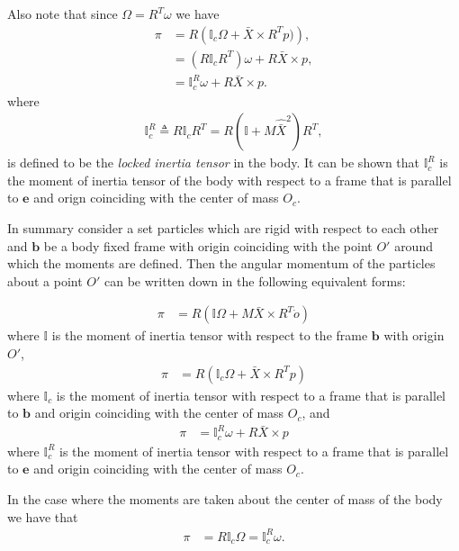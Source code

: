 \documentclass[graybox,envcountchap,sectrefs]{svmonoMuga}
\begin{document}
Also note that since $\Omega =R^T\omega$ we have
\begin{align}
\pi&=R\left(\mathbb{I}_c\Omega +\bar{X}\times R^Tp)\right),\\
&=(R\mathbb{I}_cR^T)\omega +R\bar{X}\times p,\\
&=\mathbb{I}_c^R\omega +R\bar{X}\times p.
\end{align}
where 
\begin{align}
\mathbb{I}_c^R\triangleq R\mathbb{I}_cR^T=R(\mathbb{I}+M\widehat{\bar{X}}^2)R^T,
\end{align}
is defined to be the \textit{locked inertia tensor} in the body. It can be shown that $\mathbb{I}_c^R$ is the moment of inertia tensor of the body with respect to a frame that is parallel to $\mathbf{e}$ and  orign coinciding with the center of mass $O_c$.

\begin{svgraybox}
In summary consider a set particles which are rigid with respect to each other and $\mathbf{b}$ be a body fixed frame with origin coinciding with the point $O'$ around which the moments are defined.
Then the angular momentum of the particles about a point $O'$ can be written down in the following equivalent forms:

\begin{align}
\pi&=R\left(\mathbb{I}\Omega+M\bar{X}\times R^T\dot{o}\right)
\end{align}
where $\mathbb{I}$ is the moment of inertia tensor with respect to the frame $\mathbf{b}$ with origin $O'$,
\begin{align}
\pi&=R\left(\mathbb{I}_c\Omega+\bar{X}\times R^Tp\right)
\end{align}
where $\mathbb{I}_c$ is the moment of inertia tensor with respect to a frame that is parallel to $\mathbf{b}$ and  origin coinciding with the center of mass $O_c$, and
\begin{align}
\pi&=\mathbb{I}_c^R\omega+R\bar{X}\times p
\end{align}
where $\mathbb{I}_c^R$ is the moment of inertia tensor with respect to a frame that is parallel to $\mathbf{e}$ and  origin coinciding with the center of mass $O_c$.
\end{svgraybox}

In the case where the moments are taken about the center of mass of the body we have that
\begin{align}
\pi&=R\mathbb{I}_c\Omega=\mathbb{I}_c^R\omega.
\end{align}
\end{document}
